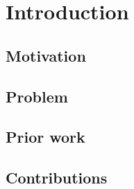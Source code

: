 \section{Introduction}\label{sec:introduction}


\subsection{Motivation}\label{sec:intro:motivation}

\subsection{Problem}\label{sec:intro:problem}

\subsection{Prior work}\label{sec:intro:prior}

\subsection{Contributions}\label{sec:intro:contributions}
